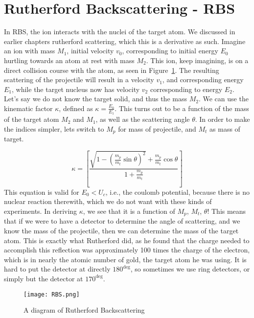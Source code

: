 \section{Rutherford Backscattering - RBS}\label{sec:rutherford-backscattering---rbs}
In RBS, the ion interacts with the nuclei of the target atom.
We discussed in earlier chapters rutherford scattering, which this is a derivative as such.
Imagine an ion with mass $M_1$, initial velocity $v_0$, corresponding to initial energy $E_0$ hurtling towards an atom at rest with mass $M_2$.
This ion, keep imagining, is on a direct collision course with the atom, as seen in Figure~\ref{fig:RBS}.
The resulting scattering of the projectile will result in a velocity $v_1$, and corresponding energy $E_1$, while the target nucleus now has velocity $v_2$ corresponding to energy $E_2$.
Let's say we do not know the target solid, and thus the mass $M_2$.
We can use the kinematic factor $\kappa $, defined as $\kappa = \frac{E_0}{E_1}$.
This turns out to be a function of the mass of the target atom $M_2$ and $M_1$, as well as the scattering angle $\theta$.
In order to make the indices simpler, lets switch to $M_p $ for mass of projectile, and $M_t$ as mass of target.

\begin{equation}
	\kappa = \left[ \frac{\sqrt{1 - \left( \frac{m_p}{m_t} \sin\theta \right)^2}  + \frac{m_p}{m_t}\cos\theta}{1+\frac{m_p}{m_t}} \right ]
\end{equation}
This equation is valid for $E_0 < U_c$, i.e., the coulomb potential, because there is no nuclear reaction therewith, which we do not want with these kinds of experiments.
In deriving $\kappa$, we see that it is a function of $M_p$, $M_t$, $\theta$! This means that if we were to have a detector to determine the angle of scattering, and we know the mass of the projectile, then we can determine the mass of the target atom.
This is exactly what Rutherford did, as he found that the charge needed to accomplish this reflection was approximately 100 times the charge of the electron, which is in nearly the atomic number of gold, the target atom he was using.
It is hard to put the detector at directly $180^{\deg}$, so sometimes we use ring detectors, or simply but the detector at $170^{\deg}$.
\begin{figure}
	\centering
	\texttt{[image: RBS.png]}
	\caption{A diagram of Rutherford Backscattering}
	\label{fig:RBS}
\end{figure}
